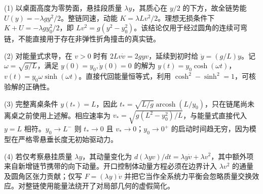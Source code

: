 (1) 以桌面高度为零势面，悬挂段质量 \(\lambda y\)，其质心在 \(y/2\) 的下方，故全链势能 \(U(y)=-\lambda gy^2/2\)。整链同速，动能 \(K=\lambda Lv^2/2\)。理想无损条件下 \(K+U=-\lambda gy_0^2/2\)，即 \(Lv^2=g(y^2-y_0^2)\)。该结论仅用于经过圆角的连续可弯链，不能直接用于存在非弹性折角撞击的真实链。

(2) 对能量式求导，在 \(v>0\) 时有 \(2Lv\dot v=2gyv\)，延续到初时给 \(\ddot y=(g/L)y\)。记 \(\omega=\sqrt{g/L}\)，满足 \(y(0)=y_0,\dot y(0)=0\) 的解为 \(y(t)=y_0\cosh(\omega t)\)，\(v(t)=y_0\omega\sinh(\omega t)\)。直接代回能量恒等式，利用 \(\cosh^2-\sinh^2=1\)，可核验解的正确性。

(3) 完整离桌条件 \(y(t_*)=L\)，因此 \(t_*=\sqrt{L/g}\operatorname{arcosh}(L/y_0)\)，只在链尾尚未离桌之前使用上述解。相应速率为 \(v_*=\sqrt{g(L^2-y_0^2)/L}\)，与能量式直接代入 \(y=L\) 相符。\(y_0\to L^-\) 则 \(t_*\to0\) 且 \(v_*\to0\)；\(y_0\to0^+\) 的启动时间趋无穷，因为模型在严格零悬垂长度无初始驱动力。

(4) 若仅考察悬挂质量 \(\lambda y\)，其动量变化为 \(d(\lambda yv)/dt=\lambda y\dot v+\lambda v^2\)，其中额外项来自新增链节携带的向下动量。开口控制体动量方程必须在边界计入 \(\lambda v^2\) 的通量及圆角区张力贡献；仅写 \(F=(\lambda y)\dot v\) 并把它当作全系统力平衡会忽略质量交换效应。对整链使用能量法绕开了对局部几何的虚假简化。

